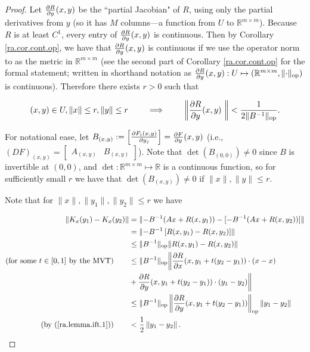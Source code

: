 \begin{proof}
Let \(\pderiv{R}{y} (x,y)\) be the ``partial Jacobian" of \(R\), using only the partial derivatives from \(y\) (so it has \(M\) columns---a function from \(U\) to \(\mathbb{R}^{m \times m}\)). Because \(R\) is at least \(C^1\), every entry of \(\pderiv{R}{y} (x,y)\) is continuous. Then by Corollary \ref{ra.cor.cont.op}, we have that \(\pderiv{R}{y} (x,y)\) is continuous if we use the operator norm to as the metric in \(\mathbb{R}^{m \times m}\) (see the second part of Corollary \ref{ra.cor.cont.op} for the formal statement; written in shorthand notation as \(\pderiv{R}{y} (x,y): U \mapsto (\mathbb{R}^{m \times m}, \lVert \cdot \rVert_{\text{op}})\) is continuous). Therefore there exists \(r > 0\) such that

\begin{equation}\label{ra.lemma.ift.1}
(x,y) \in U, \lVert x \rVert \leq r, \lVert y \rVert \leq r \qquad \implies \qquad  \left \lVert \pderiv{R}{y} (x,y)\ \right\rVert < \frac{1}{2 \lVert B^{-1} \rVert_{\text{op}}}.
 \end{equation}

For notational ease, let \(B_{(x,y)} := \begin{bmatrix} \pderiv{F_i(x,y)}{y_j} \end{bmatrix} = \pderiv{F}{y}(x,y)\) (i.e., \((DF)_{(x,y)} = \begin{bmatrix} A_{(x,y)} & B_{(x,y)} \end{bmatrix}\)). Note that \(\operatorname{det}(B_{(0,0)}) \neq 0\) since \(B\) is invertible at \((0,0)\), and \(\operatorname{det}: \mathbb{R}^{m \times m} \mapsto \mathbb{R}\) is a continuous function, so for sufficiently small \(r\) we have that \(\operatorname{det}(B_{(x,y)}) \neq 0\) if \(\lVert x \rVert, \lVert y \rVert \leq r\).


Note that for \(\lVert x \rVert, \lVert y_1 \rVert, \lVert y_2 \rVert \leq r \) we have

\begin{align}
\lVert K_x(y_1) - K_x(y_2) \rVert & = \lVert -B^{-1}(Ax + R(x,y_1)) - [-B^{-1}(Ax + R(x,y_2))] \rVert \nonumber
\\ & = \lVert - B^{-1} \left[R(x,y_1)  - R(x,y_2) \right] \rVert \nonumber
\\ & \leq \lVert B^{-1} \rVert_{\text{op}} \lVert R(x,y_1)  - R(x,y_2) \rVert \nonumber
\\ \text{(for some \(t \in [0,1]\) by the MVT)} \qquad & \leq \lVert B^{-1} \rVert_{\text{op}} \bigg\lVert \pderiv{R}{x}(x, y_1 + t(y_2 - y_1))  \cdot (x - x) \nonumber
\\ & +  \pderiv{R}{y}(x, y_1 + t(y_2 - y_1)) \cdot (y_1 - y_2) \bigg\rVert \nonumber
\\  & \leq \lVert B^{-1} \rVert_{\text{op}} \left\lVert  \pderiv{R}{y}(x, y_1 + t(y_2 - y_1)) \right\rVert_{\text{op}}  \left\lVert y_1 - y_2 \right\rVert \nonumber
\\ \text{(by (\ref{ra.lemma.ift.1}))} \qquad & <  \frac{1}{2}  \left\lVert y_1 - y_2 \right\rVert. \label{ra.lemma.ift.2}
\end{align}


\end{proof}
